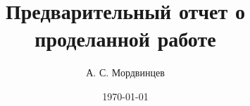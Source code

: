\documentclass[a4paper,14pt]{extreport}
\begin{document}
\title{Предварительный отчет о проделанной работе}
\author{А. С. Мордвинцев}
\date{\today}


\sloppy  %

\maketitle

\setcounter{page}{3}

\tableofcontents








\end{document}
